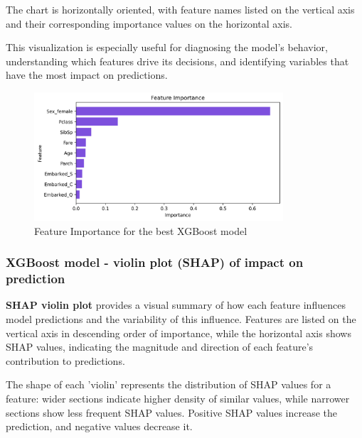 \documentclass{article}%
\begin{document}
        \hspace{20px}The chart is horizontally oriented, with feature names listed on the vertical axis and their corresponding importance values on the horizontal axis.

        \hspace{20px}This visualization is especially useful for diagnosing the model's behavior, understanding which features drive its decisions, 
        and identifying variables that have the most impact on predictions.\\
        \newline


\begin{figure}[h!]%
\centering%
\includegraphics[width=350px]{XAI/XGBoost/feature_importance.png}%
\caption{Feature Importance for the best XGBoost model}%
\end{figure}

%
\newpage%
\subsubsection{XGBoost model {-} violin plot (SHAP) of impact on prediction}%
\label{ssubsec:XGBoostmodel{-}violinplot(SHAP)ofimpactonprediction}%

        \textbf{SHAP violin plot} provides a visual summary of how each feature influences model predictions and the variability of this influence. 
        Features are listed on the vertical axis in descending order of importance, while the horizontal axis shows SHAP values, 
        indicating the magnitude and direction of each feature's contribution to predictions.

        \hspace{20px}The shape of each 'violin' represents the distribution of SHAP values for a feature: wider sections indicate higher density of similar values, 
        while narrower sections show less frequent SHAP values. Positive SHAP values increase the prediction, and negative values decrease it.
\end{document}
